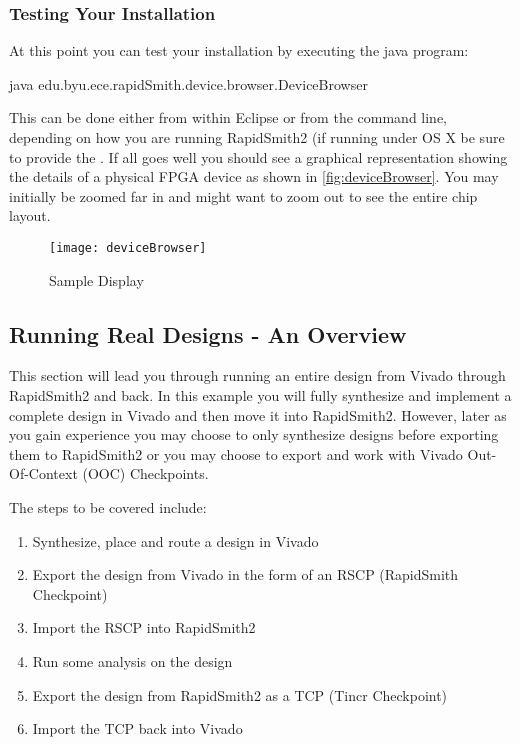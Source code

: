 \subsubsection{Testing Your Installation}
\noindent At this point you can test your installation by executing the java
 program: 
\begin{code}
java edu.byu.ece.rapidSmith.device.browser.DeviceBrowser
\end{code} \vspace{0.1in}    

\noindent This can be done either from within Eclipse or from the command line,
depending on how you are running RapidSmith2 (if running under OS X be sure to provide the
. If all goes well you should see a
graphical representation showing the details of a physical FPGA device as shown
in \autoref{fig:deviceBrowser}.  You may initially be zoomed far in and might
want to zoom out to see the entire chip layout.

\begin{figure}[H]
\centering
\texttt{[image: deviceBrowser]}
\caption{ Sample Display}
\label{fig:deviceBrowser}
\end{figure}

\subsection{Running Real Designs - An Overview}
This section will lead you through running an entire design from Vivado through
RapidSmith2 and back.  In this example you will fully synthesize and implement a
complete design in Vivado and then move it into RapidSmith2.  However, later as you gain
experience you may choose to only synthesize  designs before exporting
them to RapidSmith2 or you may choose to export and work with Vivado Out-Of-Context
(OOC) Checkpoints.

The steps to be covered include:

\begin{enumerate}
  \item Synthesize, place and route a design in Vivado
  \item  Export the design from Vivado in the form of an RSCP (RapidSmith
  Checkpoint)
  \item Import the RSCP  into RapidSmith2
  \item Run some analysis on the design
  \item Export the design from RapidSmith2 as a TCP (Tincr Checkpoint)
  \item Import the TCP back into Vivado
\end{enumerate}

